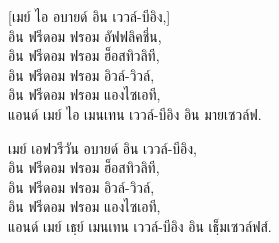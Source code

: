 \begin{english}
[เมย์ ไอ อบายด์ อิน เววล์-บีอิง,]\\
อิน ฟรีดอม ฟรอม อัฟฟลิคชึ่น,\\
อิน ฟรีดอม ฟรอม ฮ็อสทิวลิที,\\
อิน ฟรีดอม ฟรอม อิวล์-วิวล์,\\
อิน ฟรีดอม ฟรอม แองไซเอที,\\
แอนด์ เมย์ ไอ เมนเทน เววล์-บีอิง อิน มายเซวล์ฟ.
\end{english}

\begin{english}
เมย์ เอฟวรีวัน อบายด์ อิน เววล์-บีอิง,\\
อิน ฟรีดอม ฟรอม ฮ็อสทิวลิที,\\
อิน ฟรีดอม ฟรอม อิวล์-วิวล์,\\
อิน ฟรีดอม ฟรอม แองไซเอที,\\
แอนด์ เมย์ เธฺย์ เมนเทน เววล์-บีอิง อิน เธฺ็มเซวล์ฟส์.
\end{english}

